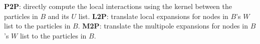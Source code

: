 \begin{algorithm}
\begin{algorithmic}
        \STATE \textbf{P2P}: directly compute the local interactions using the kernel between the particles in $B$ and its $U$ list.
        \STATE \textbf{L2P}: translate local expansions for nodes in $B$'s $W$ list to the particles in $B$.
        \STATE \textbf{M2P}: translate the multipole expansions for nodes in $B$'s $W$ list to the particles in $B$.
        \ENDFOR
    \end{algorithmic}
    \end{algorithm}